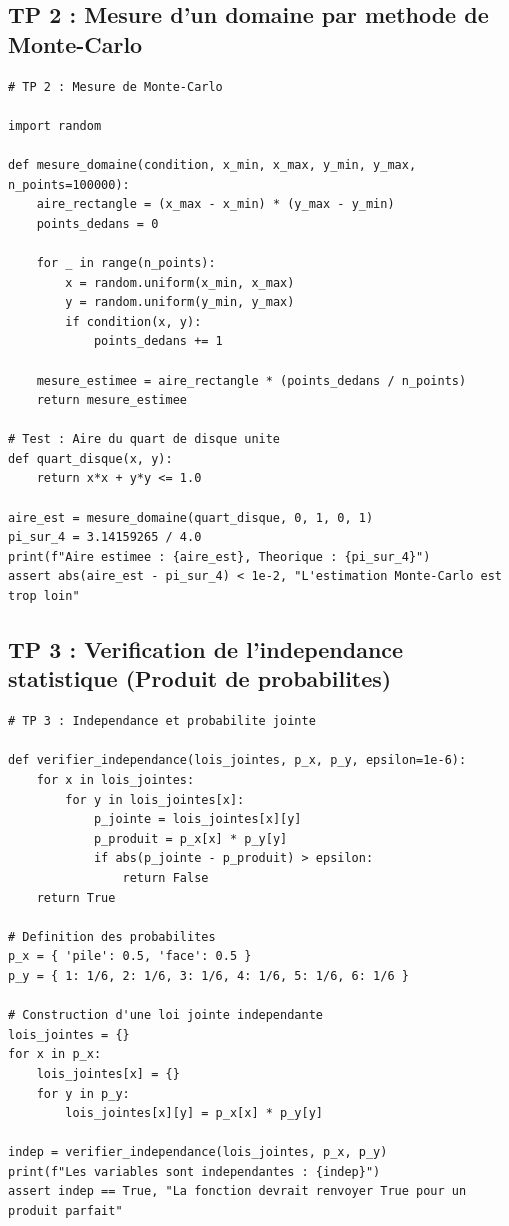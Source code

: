 \documentclass[11pt,a4paper]{article}
\begin{document}
\subsection*{TP 2 : Mesure d'un domaine par methode de Monte-Carlo}
\begin{lstlisting}
# TP 2 : Mesure de Monte-Carlo

import random

def mesure_domaine(condition, x_min, x_max, y_min, y_max, n_points=100000):
    aire_rectangle = (x_max - x_min) * (y_max - y_min)
    points_dedans = 0

    for _ in range(n_points):
        x = random.uniform(x_min, x_max)
        y = random.uniform(y_min, y_max)
        if condition(x, y):
            points_dedans += 1

    mesure_estimee = aire_rectangle * (points_dedans / n_points)
    return mesure_estimee

# Test : Aire du quart de disque unite
def quart_disque(x, y):
    return x*x + y*y <= 1.0

aire_est = mesure_domaine(quart_disque, 0, 1, 0, 1)
pi_sur_4 = 3.14159265 / 4.0
print(f"Aire estimee : {aire_est}, Theorique : {pi_sur_4}")
assert abs(aire_est - pi_sur_4) < 1e-2, "L'estimation Monte-Carlo est trop loin"
\end{lstlisting}

\subsection*{TP 3 : Verification de l'independance statistique (Produit de probabilites)}
\begin{lstlisting}
# TP 3 : Independance et probabilite jointe

def verifier_independance(lois_jointes, p_x, p_y, epsilon=1e-6):
    for x in lois_jointes:
        for y in lois_jointes[x]:
            p_jointe = lois_jointes[x][y]
            p_produit = p_x[x] * p_y[y]
            if abs(p_jointe - p_produit) > epsilon:
                return False
    return True

# Definition des probabilites
p_x = { 'pile': 0.5, 'face': 0.5 }
p_y = { 1: 1/6, 2: 1/6, 3: 1/6, 4: 1/6, 5: 1/6, 6: 1/6 }

# Construction d'une loi jointe independante
lois_jointes = {}
for x in p_x:
    lois_jointes[x] = {}
    for y in p_y:
        lois_jointes[x][y] = p_x[x] * p_y[y]

indep = verifier_independance(lois_jointes, p_x, p_y)
print(f"Les variables sont independantes : {indep}")
assert indep == True, "La fonction devrait renvoyer True pour un produit parfait"
\end{lstlisting}
\end{document}
